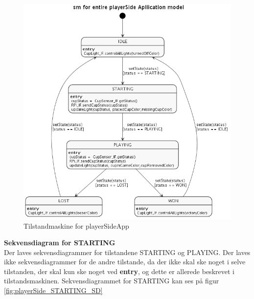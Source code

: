 \documentclass[Arkitektur/System_main.tex]{subfiles}
\begin{document}
\begin{figure}[H]
    \centering
    \includegraphics[width=\textwidth]{Arkitektur/Softwarearkitektur/Applikationsmodel/PlayerSide/graphics/state.png}
    \caption{Tilstandmaskine for playerSideApp}
    \label{fig:playerSide_SM}
\end{figure}

\textbf{Sekvensdiagram for STARTING}\\
Der laves sekvensdiagrammer for tilstandene STARTING og PLAYING. Der laves ikke sekvensdiagrammer for de andre tilstande, da der ikke skal ske noget i selve tilstanden, der skal kun ske noget ved \textbf{entry}, og dette er allerede beskrevet i tilstandsmaskinen. Sekvensdiagrammet for STARTING kan ses på figur \ref{fig:playerSide_STARTING_SD}
\end{document}
